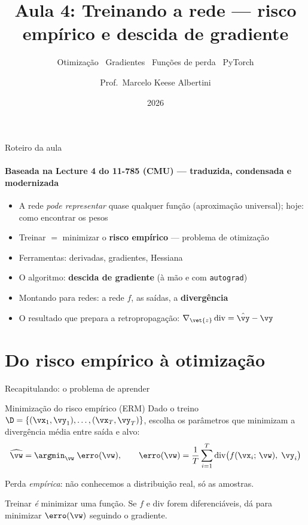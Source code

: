 \documentclass[aspectratio=169, 11pt]{beamer}
\title[Aula 4 — Treinando a rede]{Aula 4: Treinando a rede — risco empírico e descida de gradiente}
\subtitle[GBC073 — Inteligência Computacional]{Otimização \textbullet\ Gradientes \textbullet\ Funções de perda \textbullet\ PyTorch}
\author[Prof.\ Marcelo Albertini]{Prof.\ Marcelo Keese Albertini}
\institute{GBC073 — Inteligência Computacional \textbullet\ Universidade Federal de Uberlândia}
\date{2026}
\begin{document}
\begin{frame}
  \titlepage
\end{frame}

\begin{frame}{Roteiro da aula}
  \framesubtitle{Baseada na Lecture 4 do 11-785 (CMU) — traduzida, condensada e modernizada}
  \begin{itemize}\setlength{\itemsep}{0.5ex}
    \item<1-> A rede \emph{pode representar} quase qualquer função (aproximação
          universal); hoje: \alert{como encontrar os pesos}
    \item<2-> Treinar $=$ minimizar o \textbf{risco empírico} — problema de otimização
    \item<3-> Ferramentas: derivadas, gradientes, Hessiana
    \item<4-> O algoritmo: \textbf{descida de gradiente} (à mão e com \texttt{autograd})
    \item<5-> Montando para redes: a rede $f$, as saídas, a \textbf{divergência}
    \item<6-> O resultado que prepara a retropropagação:
          $\nabla_{\vet{z}}\,\mathrm{div} = \hat{\vy} - \vy$
  \end{itemize}
\end{frame}

\section{Do risco empírico à otimização}

\begin{frame}{Recapitulando: o problema de aprender}
  \begin{defbox}{Minimização do risco empírico (ERM)}
    Dado o treino $\D = \{(\vx_1, \vy_1), \dots, (\vx_T, \vy_T)\}$, escolha os
    parâmetros que minimizam a divergência média entre saída e alvo:
    \[
      \widehat{\vw} = \argmin_{\vw}\; \erro(\vw), \qquad
      \erro(\vw) = \frac{1}{T} \sum_{i=1}^{T}
        \mathrm{div}\big( f(\vx_i;\, \vw),\; \vy_i \big)
    \]
  \end{defbox}

  Perda \emph{empírica}: não conhecemos a distribuição real, só as amostras.

  \begin{ideiabox}
    Treinar \emph{é} minimizar uma função. Se $f$ e $\mathrm{div}$ forem
    \alert{diferenciáveis}, dá para minimizar $\erro(\vw)$ seguindo o gradiente.
  \end{ideiabox}
\end{frame}
\end{document}
